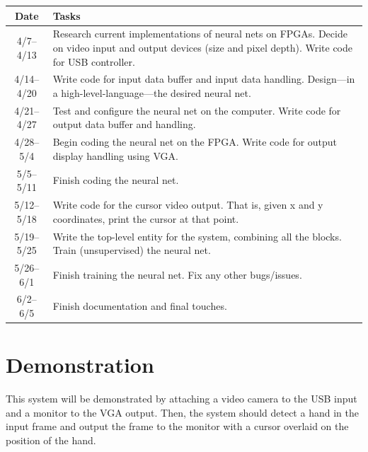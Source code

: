 \documentclass[10pt]{article}
\begin{document}
\setlength\extrarowheight{3pt}
\begin{tabularx}{\textwidth}{c X}
    Date & Tasks \\
    \midrule
    4/7--4/13 & Research current implementations of neural nets on FPGAs. Decide
    on video input and output devices (size and pixel depth). Write code for USB
    controller. \\
    4/14--4/20 & Write code for input data buffer and input data handling.
    Design---in a high-level-language---the desired neural net. \\
    4/21--4/27 & Test and configure the neural net on the computer. Write code
    for output data buffer and handling. \\
    4/28--5/4 & Begin coding the neural net on the FPGA\@. Write code for output
    display handling using VGA\@. \\
    5/5--5/11 & Finish coding the neural net. \\
    5/12--5/18 & Write code for the cursor video output. That is, given x and y
    coordinates, print the cursor at that point. \\
    5/19--5/25 & Write the top-level entity for the system, combining all the
    blocks. Train (unsupervised) the neural net. \\
    5/26--6/1 & Finish training the neural net. Fix any other bugs/issues. \\
    6/2--6/5 & Finish documentation and final touches.
\end{tabularx}

\section{Demonstration}
\label{sec:demonstration}

This system will be demonstrated by attaching a video camera to the USB input
and a monitor to the VGA output. Then, the system should detect a hand in the
input frame and output the frame to the monitor with a cursor overlaid on the
position of the hand.
\end{document}
